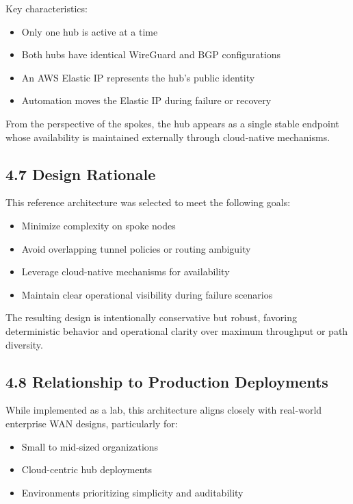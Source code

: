 \documentclass[11pt]{article}
\begin{document}
Key characteristics:

\begin{itemize}
  \item Only one hub is active at a time
  \item Both hubs have identical WireGuard and BGP configurations
  \item An AWS Elastic IP represents the hub's public identity
  \item Automation moves the Elastic IP during failure or recovery
\end{itemize}

From the perspective of the spokes, the hub appears as a single stable endpoint whose availability is maintained externally through cloud-native mechanisms.

\subsection{4.7 Design Rationale}
\label{sec:design-rationale}

This reference architecture was selected to meet the following goals:

\begin{itemize}
  \item Minimize complexity on spoke nodes
  \item Avoid overlapping tunnel policies or routing ambiguity
  \item Leverage cloud-native mechanisms for availability
  \item Maintain clear operational visibility during failure scenarios
\end{itemize}

The resulting design is intentionally conservative but robust, favoring deterministic behavior and operational clarity over maximum throughput or path diversity.

\subsection{4.8 Relationship to Production Deployments}
\label{sec:production-alignment}

While implemented as a lab, this architecture aligns closely with real-world enterprise WAN designs, particularly for:

\begin{itemize}
  \item Small to mid-sized organizations
  \item Cloud-centric hub deployments
  \item Environments prioritizing simplicity and auditability
\end{itemize}
\end{document}
